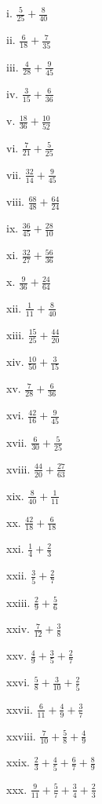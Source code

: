 \documentclass[]{book}
\begin{document}
\begin{multicols}{2}
  
    i. $\frac{5}{25} + \frac{8}{40}$
  
    ii. $\frac{6}{18} + \frac{7}{35}$
  
    iii. $\frac{4}{28} + \frac{9}{45}$
  
    iv. $\frac{3}{15} + \frac{6}{36}$
  
    v. $\frac{18}{36} + \frac{10}{52}$
  
    vi. $\frac{7}{21} + \frac{5}{25}$
  
    vii. $\frac{32}{14} + \frac{9}{45}$
  
    viii. $\frac{68}{48} + \frac{64}{24}$
  
    ix. $\frac{36}{45} + \frac{28}{10}$
  
    xi. $\frac{32}{27} + \frac{56}{36}$
  
    x. $\frac{9}{36} + \frac{24}{64}$
  
    xii. $\frac{1}{11} + \frac{8}{40}$
  
    xiii. $\frac{15}{25} + \frac{44}{20}$
  
    xiv. $\frac{10}{50} + \frac{3}{15}$
  
    xv. $\frac{7}{28} + \frac{6}{36}$
  
    xvi. $\frac{42}{16} + \frac{9}{45}$
  
    xvii. $\frac{6}{30} + \frac{5}{25}$
  
    xviii. $\frac{44}{20} + \frac{27}{63}$
  
    xix. $\frac{8}{40} + \frac{1}{11}$
  
    xx. $\frac{42}{18} + \frac{6}{18}$
  
    xxi. $\frac{1}{4} + \frac{2}{3}$
  
    xxii. $\frac{3}{5} + \frac{2}{7}$
  
    xxiii. $\frac{2}{9} + \frac{5}{6}$
  
    xxiv. $\frac{7}{12} + \frac{3}{8}$
  
    xxv. $\frac{4}{9} + \frac{3}{5} + \frac{2}{7}$
  
    xxvi. $\frac{5}{8} + \frac{3}{10} + \frac{2}{5}$
  
    xxvii. $\frac{6}{11} + \frac{4}{9} + \frac{3}{7}$
  
    xxviii. $\frac{7}{10} + \frac{5}{8} + \frac{4}{9}$
  
    xxix. $\frac{2}{3} + \frac{4}{5} + \frac{6}{7} + \frac{8}{9}$
  
    xxx. $\frac{9}{11} + \frac{5}{7} + \frac{3}{4} + \frac{2}{3}$
  

\end{multicols}
\end{document}

